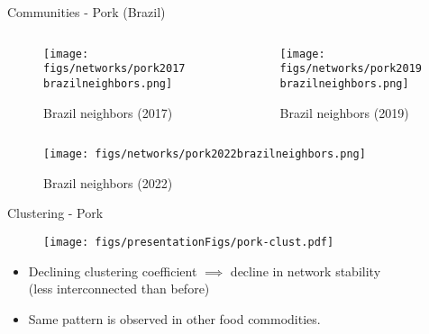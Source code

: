 \documentclass[10pt,xcolor={dvipsnames}]{beamer}
\begin{document}
\begin{frame}{Communities - Pork (Brazil)}
\begin{columns}[onlytextwidth]
    \begin{column}{.5\textwidth}
        \begin{minipage}[t][.5\textheight][t]{\textwidth}
            \begin{figure}
                \caption*{\tiny Brazil neighbors (2017)}
                \texttt{[image: figs/networks/pork2017brazilneighbors.png]}
            \end{figure}
        \end{minipage}
    \end{column}
\hfill
    \begin{column}{.5\textwidth}
        \begin{minipage}[t][.5\textheight][t]{\textwidth}
            \begin{figure}
                \caption*{\tiny Brazil neighbors (2019)}
                \texttt{[image: figs/networks/pork2019brazilneighbors.png]}\\
            \end{figure}
        \end{minipage}
    \end{column}
\end{columns}
\vspace{-35pt}
\begin{figure}
    \centering
    \caption*{\tiny Brazil neighbors (2022)}

    \texttt{[image: figs/networks/pork2022brazilneighbors.png]}    
\end{figure}

\end{frame}
\fi 

\begin{frame}{Clustering - Pork}
\begin{figure}
    \centering
    \texttt{[image: figs/presentationFigs/pork-clust.pdf]}
\end{figure}
\begin{itemize}
    \small
    \item[\ding{213}] Declining clustering coefficient $\implies$ decline in network stability \\
    \hfill \footnotesize (less interconnected than before)\quad \phantom{asdj}
    \small
    \item[\ding{213}] Same pattern is observed in other food commodities.
\end{itemize}
\end{frame}
\end{document}
